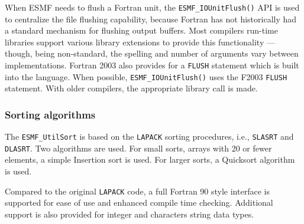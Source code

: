 When ESMF needs to flush a Fortran unit, the {\tt ESMF\_IOUnitFlush()} API is used
to centralize the file flushing capability, because Fortran has not historically
had a standard mechanism for flushing output buffers.  Most compilers run-time libraries
support various library extensions to provide this functionality --- though,
being non-standard, the spelling and number of arguments vary between implementations.
Fortran 2003 also provides for a {\tt FLUSH} statement which is built into the
language.  When possible, {\tt ESMF\_IOUnitFlush()} uses the F2003 {\tt FLUSH} statement.
With older compilers, the appropriate library call is made.

\subsubsection{Sorting algorithms}

The {\tt ESMF\_UtilSort} is based on the {\tt LAPACK} sorting procedures,
i.e., {\tt SLASRT} and {\tt DLASRT}.  Two algorithms are used.
For small sorts, arrays with 20 or fewer elements, a simple Insertion sort is
used.  For larger sorts, a Quicksort algorithm is used.

Compared to the original {\tt LAPACK} code, a full Fortran 90 style
interface is supported for ease of use and enhanced compile time checking.
Additional support is also provided for integer and characters string data
types.
